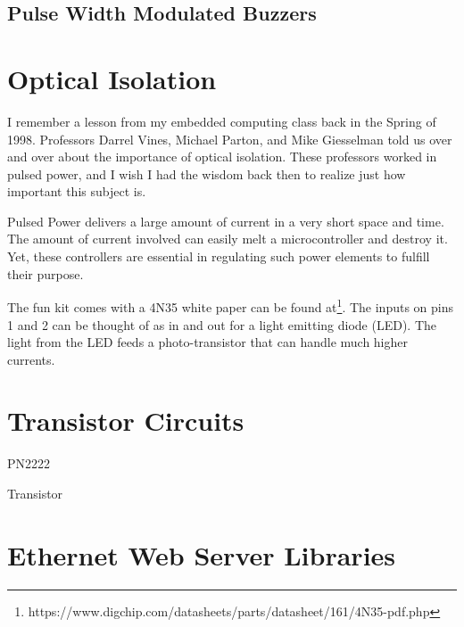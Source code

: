 \documentclass{article}
\begin{document}

\subsection{Pulse Width Modulated Buzzers} %
\label{sub:pulse_width_modulated_buzzers}




\section{Optical Isolation} %
\label{sec:optical_isolation}

I remember a lesson from my embedded computing class back in the Spring of 1998.  Professors Darrel Vines, Michael Parton, and Mike Giesselman told us over and over about the importance of optical isolation.  These professors worked in pulsed power, and I wish I had the wisdom back then to realize just how important this subject is.  %

Pulsed Power delivers a large amount of current in a very short space and time.  The amount of current involved can easily melt a microcontroller and destroy it.  Yet, these controllers are essential in regulating such power elements to fulfill their purpose.  

The fun kit comes with a 4N35 white paper can be found at\footnote{https://www.digchip.com/datasheets/parts/datasheet/161/4N35-pdf.php}. The inputs on pins 1 and 2 can be thought of as in and out for a light emitting diode (LED).  The light from the LED feeds a photo-transistor that can handle much higher currents. 


\section{Transistor Circuits} %
\label{sec:transistor_circuits}

PN2222

Transistor




\section{Ethernet Web Server Libraries} %
\label{sec:ethernet_web_server_libraries}
\end{document}
